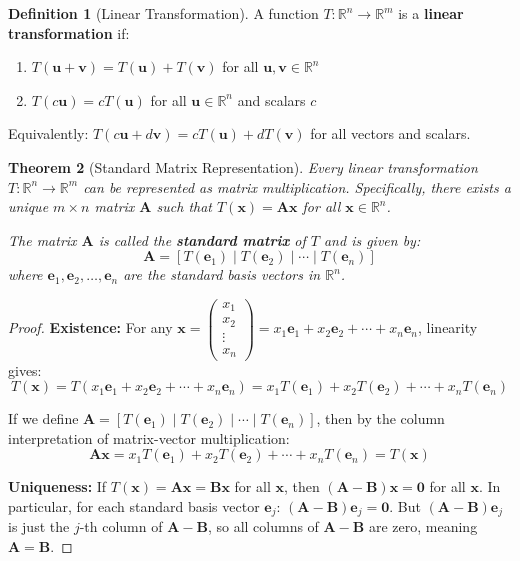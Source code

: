 \documentclass[12pt]{article}
\numberwithin{equation}{section}
\newcommand{\RR}{\mathbb{R}}
\newcommand{\vect}[1]{\boldsymbol{#1}}   %
\newcommand{\mat}[1]{\mathbf{#1}}        %
\theoremstyle{plain}
\newtheorem{theorem}{Theorem}[section]
\theoremstyle{definition}
\newtheorem{definition}[theorem]{Definition}
\theoremstyle{remark}
\begin{document}
\begin{definition}[Linear Transformation]
A function $T: \RR^n \to \RR^m$ is a \textbf{linear transformation} if:
\begin{enumerate}
\item $T(\vect{u} + \vect{v}) = T(\vect{u}) + T(\vect{v})$ for all $\vect{u}, \vect{v} \in \RR^n$
\item $T(c\vect{u}) = cT(\vect{u})$ for all $\vect{u} \in \RR^n$ and scalars $c$
\end{enumerate}
Equivalently: $T(c\vect{u} + d\vect{v}) = cT(\vect{u}) + dT(\vect{v})$ for all vectors and scalars.
\end{definition}

\begin{theorem}[Standard Matrix Representation]
Every linear transformation $T: \RR^n \to \RR^m$ can be represented as matrix multiplication. Specifically, there exists a unique $m \times n$ matrix $\mat{A}$ such that $T(\vect{x}) = \mat{A}\vect{x}$ for all $\vect{x} \in \RR^n$.

The matrix $\mat{A}$ is called the \textbf{standard matrix} of $T$ and is given by:
$$\mat{A} = [T(\vect{e}_1) \mid T(\vect{e}_2) \mid \cdots \mid T(\vect{e}_n)]$$
where $\vect{e}_1, \vect{e}_2, \ldots, \vect{e}_n$ are the standard basis vectors in $\RR^n$.
\end{theorem}

\begin{proof}
\textbf{Existence:} For any $\vect{x} = \begin{pmatrix} x_1 \\ x_2 \\ \vdots \\ x_n \end{pmatrix} = x_1\vect{e}_1 + x_2\vect{e}_2 + \cdots + x_n\vect{e}_n$, linearity gives:
$$T(\vect{x}) = T(x_1\vect{e}_1 + x_2\vect{e}_2 + \cdots + x_n\vect{e}_n) = x_1T(\vect{e}_1) + x_2T(\vect{e}_2) + \cdots + x_nT(\vect{e}_n)$$

If we define $\mat{A} = [T(\vect{e}_1) \mid T(\vect{e}_2) \mid \cdots \mid T(\vect{e}_n)]$, then by the column interpretation of matrix-vector multiplication:
$$\mat{A}\vect{x} = x_1T(\vect{e}_1) + x_2T(\vect{e}_2) + \cdots + x_nT(\vect{e}_n) = T(\vect{x})$$

\textbf{Uniqueness:} If $T(\vect{x}) = \mat{A}\vect{x} = \mat{B}\vect{x}$ for all $\vect{x}$, then $(\mat{A} - \mat{B})\vect{x} = \vect{0}$ for all $\vect{x}$. In particular, for each standard basis vector $\vect{e}_j$: $(\mat{A} - \mat{B})\vect{e}_j = \vect{0}$. But $(\mat{A} - \mat{B})\vect{e}_j$ is just the $j$-th column of $\mat{A} - \mat{B}$, so all columns of $\mat{A} - \mat{B}$ are zero, meaning $\mat{A} = \mat{B}$.
\end{proof}
\end{document}
